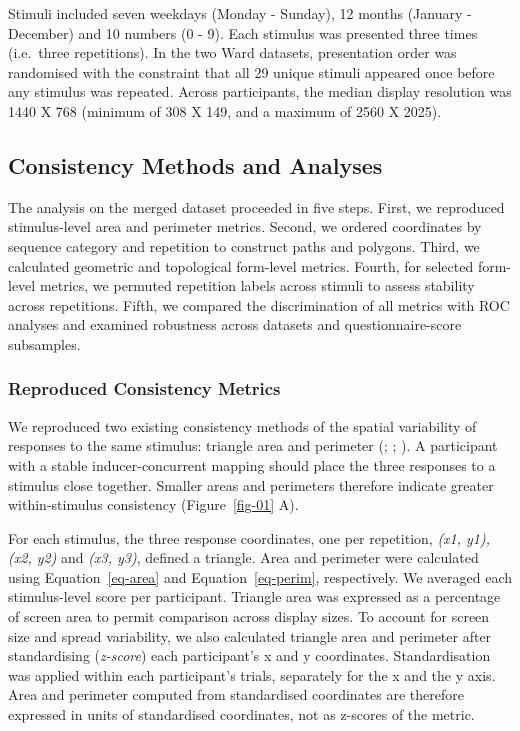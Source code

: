 \documentclass[
  man,
  floatsintext,
  longtable,
  nolmodern,
  notxfonts,
  notimes,
  colorlinks=true,linkcolor=blue,citecolor=blue,urlcolor=blue]{apa7}
\begin{document}
Stimuli included seven weekdays (Monday - Sunday), 12 months (January -
December) and 10 numbers (0 - 9). Each stimulus was presented three
times (i.e.~three repetitions). In the two Ward datasets, presentation
order was randomised with the constraint that all 29 unique stimuli
appeared once before any stimulus was repeated. Across participants, the
median display resolution was 1440 X 768 (minimum of 308 X 149, and a
maximum of 2560 X 2025).

\subsection{Consistency Methods and
Analyses}\label{consistency-methods-and-analyses}

The analysis on the merged dataset proceeded in five steps. First, we
reproduced stimulus-level area and perimeter metrics. Second, we ordered
coordinates by sequence category and repetition to construct paths and
polygons. Third, we calculated geometric and topological form-level
metrics. Fourth, for selected form-level metrics, we permuted repetition
labels across stimuli to assess stability across repetitions. Fifth, we
compared the discrimination of all metrics with ROC analyses and
examined robustness across datasets and questionnaire-score subsamples.

\subsubsection{Reproduced Consistency
Metrics}\label{reproduced-consistency-metrics}

We reproduced two existing consistency methods of the spatial
variability of responses to the same stimulus: triangle area and
perimeter (;
;
). A participant with a stable
inducer-concurrent mapping should place the three responses to a
stimulus close together. Smaller areas and perimeters therefore indicate
greater within-stimulus consistency (Figure~\ref{fig-01} A).

For each stimulus, the three response coordinates, one per repetition,
\emph{(x1, y1), (x2, y2)} and \emph{(x3, y3)}, defined a triangle. Area
and perimeter were calculated using Equation~\ref{eq-area} and
Equation~\ref{eq-perim}, respectively. We averaged each stimulus-level
score per participant. Triangle area was expressed as a percentage of
screen area to permit comparison across display sizes. To account for
screen size and spread variability, we also calculated triangle area and
perimeter after standardising (\emph{z-score}) each participant's x and
y coordinates. Standardisation was applied within each participant's
trials, separately for the x and the y axis. Area and perimeter computed
from standardised coordinates are therefore expressed in units of
standardised coordinates, not as z-scores of the metric.
\end{document}
